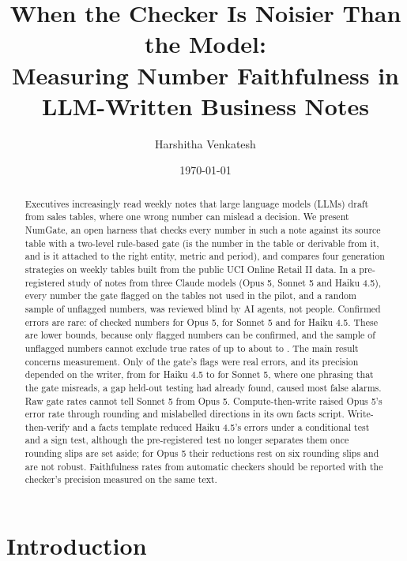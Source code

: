 \documentclass[11pt]{article}
\title{When the Checker Is Noisier Than the Model:\\Measuring Number Faithfulness in LLM-Written Business Notes}
\author{Harshitha Venkatesh}
\date{\today}
\begin{document}
\maketitle

\begin{abstract}
Executives increasingly read weekly notes that large language models (LLMs) draft from sales tables, where one wrong number can mislead a decision. We present NumGate, an open harness that checks every number in such a note against its source table with a two-level rule-based gate (is the number in the table or derivable from it, and is it attached to the right entity, metric and period), and compares four generation strategies on \NTables{} weekly tables built from the public UCI Online Retail II data. In a pre-registered study of \FullNotes{} notes from three Claude models (Opus 5, Sonnet 5 and Haiku 4.5), every number the gate flagged on the \FullPrimaryTables{} tables not used in the pilot, and a random sample of unflagged numbers, was reviewed blind by AI agents, not people. Confirmed errors are rare: \ConfOpusAll{} of checked numbers for Opus 5, \ConfSonnetAll{} for Sonnet 5 and \ConfHaikuAll{} for Haiku 4.5. These are lower bounds, because only flagged numbers can be confirmed, and the sample of unflagged numbers cannot exclude true rates of up to about \TrueRateHiSonnet{} to \TrueRateHiHaiku{}. The main result concerns measurement. Only \PrecPooled{} of the gate's flags were real errors, and its precision depended on the writer, from \PrecHaiku{} for Haiku 4.5 to \PrecSonnet{} for Sonnet 5, where one phrasing that the gate misreads, a gap held-out testing had already found, caused most false alarms. Raw gate rates cannot tell Sonnet 5 from Opus 5. Compute-then-write raised Opus 5's error rate through rounding and mislabelled directions in its own facts script. Write-then-verify and a facts template reduced Haiku 4.5's errors under a conditional test and a sign test, although the pre-registered test no longer separates them once rounding slips are set aside; for Opus 5 their reductions rest on six rounding slips and are not robust. Faithfulness rates from automatic checkers should be reported with the checker's precision measured on the same text.
\end{abstract}

\section{Introduction}
\end{document}
